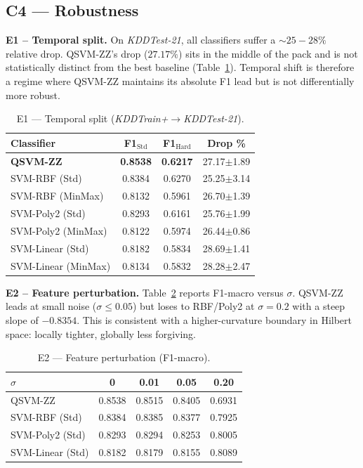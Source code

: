 \documentclass[journal]{IEEEtran}
\newcommand{\ZZ}{\textsc{ZZ}}
\newcommand{\QSVM}{QSVM-\ZZ}
\begin{document}
  \subsection{C4 --- Robustness}
  \textbf{E1 -- Temporal split.} On \textit{KDDTest-21}, all classifiers
  suffer a $\sim 25{-}28\%$ relative drop. \QSVM{}'s drop ($27.17\%$)
  sits in the middle of the pack and is not statistically distinct
  from the best baseline (Table~\ref{tab:c4-e1}). Temporal shift is
  therefore a regime where \QSVM{} maintains its absolute F1 lead but
  is not differentially more robust.

  \begin{table}[t]
  \centering
  \caption{E1 --- Temporal split (\textit{KDDTrain+}$\to$\textit{KDDTest-21}).}
  \label{tab:c4-e1}
  \small
  \begin{tabular}{lccc}
  \toprule
  Classifier & F1$_{\text{Std}}$ & F1$_{\text{Hard}}$ & Drop \%\\\midrule
  \textbf{QSVM-\ZZ{}} & \textbf{0.8538} & \textbf{0.6217} & 27.17$\pm$1.89\\
  SVM-RBF (Std)       & 0.8384 & 0.6270 & 25.25$\pm$3.14\\
  SVM-RBF (MinMax)    & 0.8132 & 0.5961 & 26.70$\pm$1.39\\
  SVM-Poly2 (Std)     & 0.8293 & 0.6161 & 25.76$\pm$1.99\\
  SVM-Poly2 (MinMax)  & 0.8122 & 0.5974 & 26.44$\pm$0.86\\
  SVM-Linear (Std)    & 0.8182 & 0.5834 & 28.69$\pm$1.41\\
  SVM-Linear (MinMax) & 0.8134 & 0.5832 & 28.28$\pm$2.47\\
  \bottomrule
  \end{tabular}
  \end{table}

  \textbf{E2 -- Feature perturbation.} Table~\ref{tab:c4-e2} reports
  F1-macro versus $\sigma$. \QSVM{} leads at small noise
  ($\sigma{\le}0.05$) but loses to RBF/Poly2 at $\sigma{=}0.2$ with a
  steep slope of $-0.8354$. This is consistent with a higher-curvature
  boundary in Hilbert space: locally tighter, globally less forgiving.

  \begin{table}[t]
  \centering
  \caption{E2 --- Feature perturbation (F1-macro).}
  \label{tab:c4-e2}
  \small
  \begin{tabular}{lcccc}
  \toprule
  $\sigma$ & 0 & 0.01 & 0.05 & 0.20\\\midrule
  QSVM-\ZZ{}        & 0.8538 & 0.8515 & 0.8405 & 0.6931\\
  SVM-RBF (Std)     & 0.8384 & 0.8385 & 0.8377 & 0.7925\\
  SVM-Poly2 (Std)   & 0.8293 & 0.8294 & 0.8253 & 0.8005\\
  SVM-Linear (Std)  & 0.8182 & 0.8179 & 0.8155 & 0.8089\\
  \bottomrule
  \end{tabular}
  \end{table}
\end{document}
